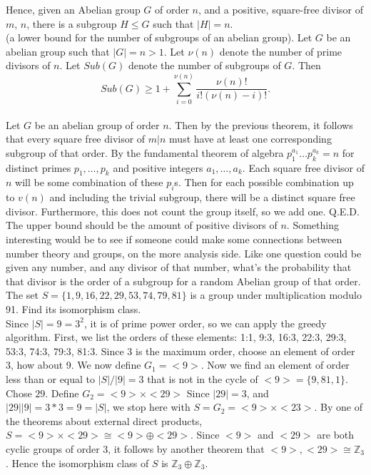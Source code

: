 \documentclass{article}
\newcommand{\Z}{\mathbb{Z}}
\begin{document}
Hence, given an Abelian group $G$ of order $n$, and a positive, square-free divisor of $m$, $n$, there is a subgroup $H\le G$ such that $|H| = n$.
\\

 (a lower bound for the number of subgroups of an abelian group). Let $G$ be an abelian group such that $|G| = n > 1$. Let $\nu(n)$ denote the number of prime divisors of $n$. Let $Sub(G)$ denote the number of subgroups of $G$. Then
$$Sub(G)\ge 1 + \sum_{i = 0}^{\nu(n)}\frac{\nu(n)!}{i!(\nu(n)-i)!}.$$\\
\newpage
{} Let $G$ be an abelian group of order $n$. Then by the previous theorem, it follows that every square free divisor of $m|n$ must have at least one corresponding subgroup of that order. By the fundamental theorem of algebra $p_1^{a_1}\dots p_k^{a_k} = n$ for distinct primes $p_1,\dots,p_k$ and positive integers $a_1,\dots ,a_k$. Each square free divisor of $n$ will be some combination of these $p_i$s. Then for each possible combination up to $v(n)$ and including the trivial subgroup, there will be a distinct square free divisor. Furthermore, this does not count the group itself, so we add one. Q.E.D.\\

 The upper bound should be the amount of positive divisors of $n$. Something interesting would be to see if someone could make some connections between number theory and groups, on the more analysis side. Like one question could be given any number, and any divisor of that number, what's the probability that that divisor is the order of a subgroup for a random Abelian group of that order. \\

 The set $S = \{1, 9, 16, 22, 29, 53, 74, 79, 81\}$ is a group under multiplication modulo 91. Find its isomorphism class. \\

 Since $|S| = 9 = 3^2$, it is of prime power order, so we can apply the greedy algorithm. First, we list the orders of these elements: 1:1, 9:3, 16:3, 22:3, 29:3, 53:3, 74:3, 79:3, 81:3. Since 3 is the maximum order, choose an element of order 3, how about 9. We now define $G_1 = <9>$. Now we find an element of order less than or equal to $|S|/|9| = 3$ that is not in the cycle of $<9> = \{9,81,1\}$. Chose $29$. Define $G_2 = <9>\times<29>$ Since $|29| = 3$, and $|29||9| = 3*3 = 9 = |S|$, we stop here with $S = G_2 = <9>\times <23>$. By one of the theorems about external direct products, $S = <9>\times <29>\cong <9>\oplus<29>$. Since $<9>$ and $<29>$ are both cyclic groups of order $3$, it follows by another theorem that $<9>,<29>\cong \Z_3$. Hence the isomorphism class of $S$ is $\Z_3\oplus \Z_3$.
\end{document}
